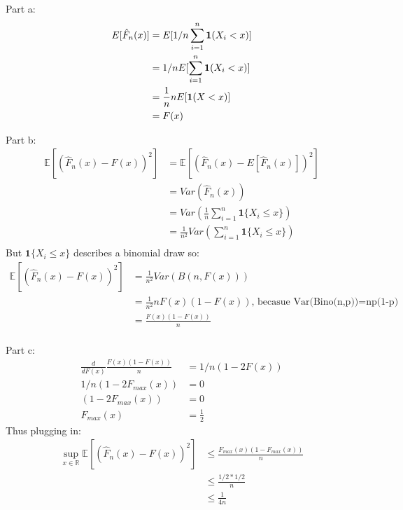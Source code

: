 \documentclass{article}
\newcommand{\field}[1]{\mathbb{#1}}
\newcommand{\1}{\mathbf{1}}
\newcommand{\E}{\mathbb{E}}
\newcommand{\R}{\field{R}} %
\begin{document}
Part a:
\begin{align}
    E[\Hat{F}_n(x)] &= E[1/n \sum_{i=1}^n \1 (X_i < x)] \\
    &= 1/n E[\sum_{i=1}^n \1 (X_i < x)] \\
    &= \frac{1}{n} n E[ \1 (X < x)] \\
    &= F(x) \\
\end{align}


Part b:\\
\begin{align}
    \E[ ( \widehat{F}_n(x) - F(x) )^2 ] & = \E[ ( \widehat{F}_n(x) - E[\widehat{F}_n(x)] )^2 ] \\
    & = Var(\widehat{F}_n(x)) \\
    & = Var( \frac{1}{n} \sum_{i=1}^n \1\{X_i \leq x\} ) \\
    & = \frac{1}{n^2} Var( \sum_{i=1}^n \1\{X_i \leq x\} ) \\
\end{align}
But $\1\{X_i \leq x\}$ describes a binomial draw so:
\begin{align}
   \E[ ( \widehat{F}_n(x) - F(x) )^2 ] & = \frac{1}{n^2} Var( B(n, F(x)) ) \\
    & = \frac{1}{n^2} n F(x)(1-F(x)) \text{, becasue Var(Bino(n,p))=np(1-p) } \\
    & = \frac{F(x)(1-F(x))}{n}  \\
\end{align}


Part c:\\
\begin{align}
    \frac{d}{dF(x)} \frac{F(x)(1-F(x))}{n} & = 1/n(1 - 2F(x)) \\
     1/n(1 - 2F_{max}(x)) & = 0 \\
    (1 - 2F_{max}(x)) & = 0 \\
    F_{max}(x) & = \frac{1}{2} 
\end{align}
Thus plugging in:
\begin{align}
    \displaystyle\sup_{x \in \R} \E[ ( \widehat{F}_n(x) - F(x) )^2 ] & \leq \frac{F_{max}(x)(1-F_{max}(x))}{n}\\
    & \leq \frac{1/2 *1/2}{n} \\
    & \leq \frac{1}{4n}
\end{align}






\newpage
\end{document}
